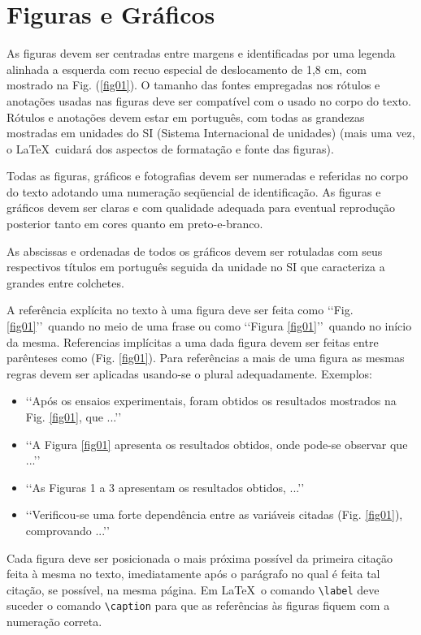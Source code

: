 \section{Figuras e Gráficos}

As figuras devem ser centradas entre margens e identificadas por uma legenda 
alinhada a esquerda com recuo especial de deslocamento de 1,8 cm, com mostrado 
na Fig. (\ref{fig01}). O tamanho das fontes empregadas nos rótulos e anotações 
usadas nas figuras deve ser compatível com o usado no corpo do texto. Rótulos e 
anotações devem estar em português, com todas as grandezas mostradas em 
unidades do SI (Sistema Internacional de unidades) (mais uma vez, o \LaTeX\
cuidará dos aspectos de formatação e fonte das figuras).

Todas as figuras, gráficos e fotografias devem ser numeradas e referidas no 
corpo do texto adotando uma numeração seqüencial de identificação. As figuras e 
gráficos devem ser claras e com qualidade adequada para eventual reprodução 
posterior tanto em cores quanto em preto-e-branco.

As abscissas e ordenadas de todos os gráficos devem ser rotuladas com seus 
respectivos títulos em português seguida da unidade no SI que caracteriza a 
grandes entre colchetes. 

A referência explícita no texto à uma figura deve ser feita como 
\lq\lq Fig. \ref{fig01}\rq\rq\ quando no meio de uma frase ou como 
\lq\lq Figura \ref{fig01}\rq\rq\ quando no início da mesma. Referencias 
implícitas a uma dada figura devem ser feitas entre parênteses como 
(Fig. \ref{fig01}). Para referências a mais de uma figura as mesmas regras 
devem ser aplicadas usando-se o plural adequadamente. Exemplos:

\begin{itemize}
	\item \lq\lq Após os ensaios experimentais, foram obtidos os resultados 
	mostrados na Fig. \ref{fig01}, que ...\rq\rq
	\item \lq\lq A Figura \ref{fig01} apresenta os resultados obtidos, onde 
	pode-se observar que ...\rq\rq
	\item \lq\lq As Figuras 1 a 3 apresentam os resultados obtidos, 
	...\rq\rq
	\item \lq\lq Verificou-se uma forte dependência entre as variáveis citadas 
	(Fig. \ref{fig01}), comprovando ...\rq\rq
\end{itemize}

Cada figura deve ser posicionada o mais próxima possível da primeira citação 
feita à mesma no texto, imediatamente após o parágrafo no qual é feita tal 
citação, se possível, na mesma página. Em \LaTeX\, o comando \texttt{\textbackslash label} deve suceder o comando \texttt{\textbackslash caption} para que as referências às figuras fiquem com a numeração correta.

